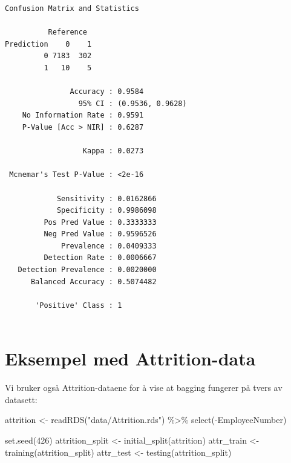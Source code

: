 \documentclass[
  letterpaper,
  DIV=11,
  numbers=noendperiod]{scrreprt}
\newenvironment{Shaded}{\begin{snugshade}}{\end{snugshade}}
\newcommand{\DecValTok}[1]{\textcolor[rgb]{0.68,0.00,0.00}{#1}}
\newcommand{\FunctionTok}[1]{\textcolor[rgb]{0.28,0.35,0.67}{#1}}
\newcommand{\NormalTok}[1]{\textcolor[rgb]{0.00,0.23,0.31}{#1}}
\newcommand{\OtherTok}[1]{\textcolor[rgb]{0.00,0.23,0.31}{#1}}
\newcommand{\SpecialCharTok}[1]{\textcolor[rgb]{0.37,0.37,0.37}{#1}}
\newcommand{\StringTok}[1]{\textcolor[rgb]{0.13,0.47,0.30}{#1}}
\begin{document}
\begin{verbatim}
Confusion Matrix and Statistics

          Reference
Prediction    0    1
         0 7183  302
         1   10    5
                                          
               Accuracy : 0.9584          
                 95% CI : (0.9536, 0.9628)
    No Information Rate : 0.9591          
    P-Value [Acc > NIR] : 0.6287          
                                          
                  Kappa : 0.0273          
                                          
 Mcnemar's Test P-Value : <2e-16          
                                          
            Sensitivity : 0.0162866       
            Specificity : 0.9986098       
         Pos Pred Value : 0.3333333       
         Neg Pred Value : 0.9596526       
             Prevalence : 0.0409333       
         Detection Rate : 0.0006667       
   Detection Prevalence : 0.0020000       
      Balanced Accuracy : 0.5074482       
                                          
       'Positive' Class : 1               
                                          
\end{verbatim}

\section{Eksempel med Attrition-data}\label{eksempel-med-attrition-data}

Vi bruker også Attrition-dataene for å vise at bagging fungerer på tvers
av datasett:

\begin{Shaded}
\begin{Highlighting}[]
\NormalTok{attrition }\OtherTok{\textless{}{-}} \FunctionTok{readRDS}\NormalTok{(}\StringTok{"data/Attrition.rds"}\NormalTok{) }\SpecialCharTok{\%\textgreater{}\%}
  \FunctionTok{select}\NormalTok{(}\SpecialCharTok{{-}}\NormalTok{EmployeeNumber)}

\FunctionTok{set.seed}\NormalTok{(}\DecValTok{426}\NormalTok{)}
\NormalTok{attrition\_split }\OtherTok{\textless{}{-}} \FunctionTok{initial\_split}\NormalTok{(attrition)}
\NormalTok{attr\_train }\OtherTok{\textless{}{-}} \FunctionTok{training}\NormalTok{(attrition\_split)}
\NormalTok{attr\_test  }\OtherTok{\textless{}{-}} \FunctionTok{testing}\NormalTok{(attrition\_split)}
\end{Highlighting}
\end{Shaded}
\end{document}
